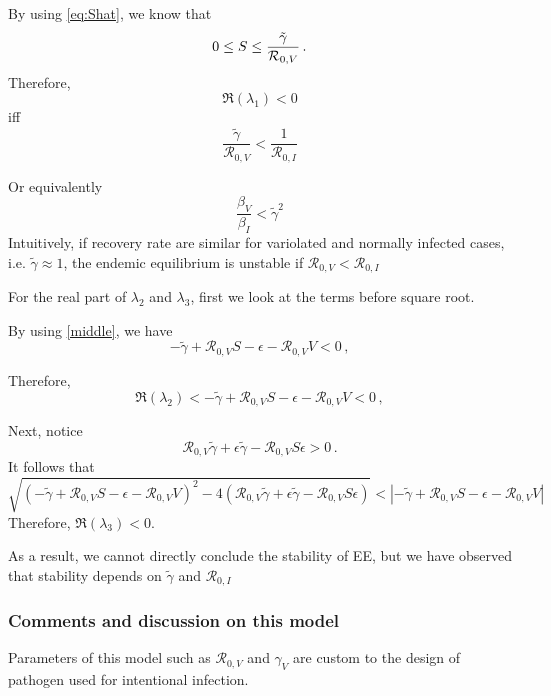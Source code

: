 \documentclass[12pt]{article}
\newcommand{\R}{\mathcal{R}}
\begin{document}
By using \autoref{eq:Shat}, we know that
\begin{equation}
0\leq S\leq \frac{\tilde{\gamma}}{\R_{0,V}}\,.{\label{middle}}
\end{equation}
Therefore, 
\begin{equation}
\Re(\lambda_1) <0
\end{equation}
iff 
\begin{equation}
\frac{\tilde{\gamma}}{\R_{0,V}}<\frac{1}{\R_{0,I}}
\end{equation}

Or equivalently 
\begin{equation}
\frac{\beta_V}{\beta_I}<\tilde{\gamma}^2
\end{equation}
Intuitively, if recovery rate are similar for variolated and normally infected cases, i.e. $\tilde{\gamma}\approx 1$, the endemic equilibrium is unstable if $\R_{0,V}<\R_{0,I}$

For the real part of $\lambda_2$ and $\lambda_3$, first we look at the terms before square root. 

By using \autoref{middle}, we have
\begin{equation}
-\tilde{\gamma}+\R_{0,V}S-\epsilon-\R_{0,V}V<0\,,
\end{equation}

Therefore,
\begin{equation}
\Re(\lambda_2)<-\tilde{\gamma}+\R_{0,V}S-\epsilon-\R_{0,V}V<0\,,
\end{equation}

Next, notice
\begin{equation}
\R_{0,V}\tilde{\gamma}+\epsilon\tilde{\gamma}-\R_{0,V}S\epsilon>0\,.
\end{equation}
It follows that
\begin{equation}
\sqrt{(-\tilde{\gamma}+\R_{0,V} S-\epsilon-\R_{0,V}V)^2-4(\R_{0,V}\tilde{\gamma}+\epsilon\tilde{\gamma}-\R_{0,V}S\epsilon)}<|-\tilde{\gamma}+\R_{0,V} S-\epsilon-\R_{0,V}V|
\end{equation}
Therefore, $\Re(\lambda_3)<0$.

As a result, we cannot directly conclude the stability of EE, but we have observed that stability depends on $\tilde{\gamma}$ and $\R_{0,I}$

\subsubsection{Comments and discussion on this model}

Parameters of this model such as $\R_{0,V}$ and $\gamma_V$ are custom to the design of pathogen used for intentional infection. 
\end{document}
